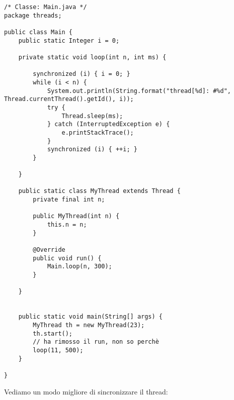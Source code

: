  
\begin{lstlisting}[basicstyle=\small,]
/* Classe: Main.java */
package threads;

public class Main {
    public static Integer i = 0;

    private static void loop(int n, int ms) {

        synchronized (i) { i = 0; }
        while (i < n) {
            System.out.println(String.format("thread[%d]: #%d", Thread.currentThread().getId(), i));
            try {
                Thread.sleep(ms);
            } catch (InterruptedException e) {
                e.printStackTrace();
            }
            synchronized (i) { ++i; }
        }

    }

    public static class MyThread extends Thread {
        private final int n;

        public MyThread(int n) {
            this.n = n;
        }

        @Override
        public void run() {
            Main.loop(n, 300);
        }

    }


    public static void main(String[] args) {
        MyThread th = new MyThread(23);
        th.start();
        // ha rimosso il run, non so perchè
        loop(11, 500);
    }

}
\end{lstlisting}

\noindent Vediamo un modo migliore di sincronizzare il thread:

